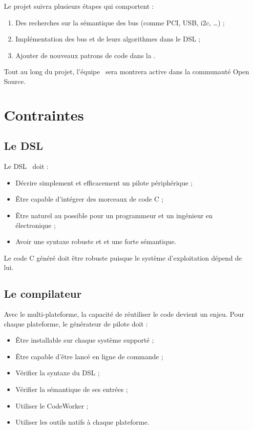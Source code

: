 \documentclass[chapterprefix=off]{rtxreport}
\begin{document}
Le projet suivra plusieurs étapes qui comportent :
\begin{enumerate}
\item Des recherches sur la sémantique des bus (comme PCI, USB, i2c, \ldots) ;
\item Implémentation des bus et de leurs algorithmes dans le DSL ;
\item Ajouter de nouveaux patrons de code dans la \BL.
\end{enumerate}

Tout au long du projet, l'équipe \rtx\  sera montrera active dans la communauté
Open Source.

\chapter{Contraintes}

\section{Le DSL}

Le DSL \rtx\ doit :
\begin{itemize}
\item Décrire simplement et efficacement un pilote périphérique ;
\item Être capable d'intégrer des morceaux de code C ;
\item Être naturel au possible pour un programmeur et un ingénieur en
électronique ;
\item Avoir une syntaxe robuste et et une forte sémantique.
\end{itemize}

Le code C généré doit être robuste puisque le système d'exploitation dépend de lui.

\section{Le compilateur}

Avec le multi-plateforme, la capacité de réutiliser le code devient un enjeu.
Pour chaque plateforme, le générateur de pilote doit :
\begin{itemize}
\item Être installable sur chaque système supporté ;
\item Être capable d'être lancé en ligne de commande ;
\item Vérifier la syntaxe du DSL ;
\item Vérifier la sémantique de ses entrées ;
\item Utiliser le CodeWorker\cite{CodeWorker} ;
\item Utiliser les outils natifs \`a chaque plateforme.
\end{itemize}
\end{document}
